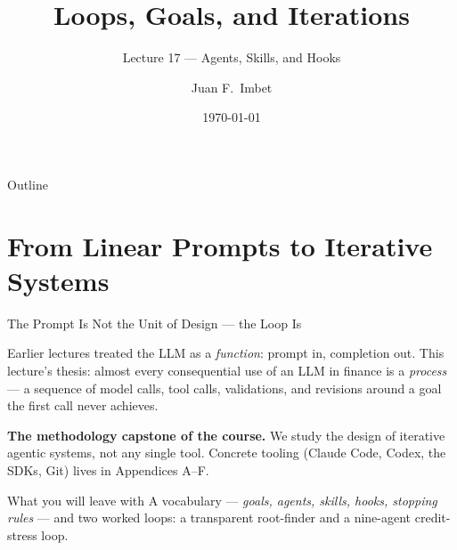 \documentclass[9pt,t]{beamer}
\title{Loops, Goals, and Iterations}
\subtitle{Lecture 17 --- Agents, Skills, and Hooks}
\author{Juan F.\ Imbet}
\institute{Paris Dauphine -- PSL University}
\date{\today}
\begin{document}
\begin{frame}\titlepage\end{frame}

\begin{frame}{Outline}\tableofcontents\end{frame}

\section{From Linear Prompts to Iterative Systems}

\begin{frame}{The Prompt Is Not the Unit of Design --- the Loop Is}

\begin{bigpicture}
Earlier lectures treated the LLM as a \emph{function}: prompt in, completion out.
This lecture's thesis: almost every consequential use of an LLM in finance is a
\emph{process} --- a sequence of model calls, tool calls, validations, and
revisions around a goal the first call never achieves.
\end{bigpicture}

\medskip
\textbf{The methodology capstone of the course.} We study the \alert{design of
iterative agentic systems}, not any single tool. Concrete tooling (Claude Code,
Codex, the SDKs, Git) lives in Appendices A--F.

\medskip
\begin{block}{What you will leave with}
A vocabulary --- \emph{goals, agents, skills, hooks, stopping rules} --- and two
worked loops: a transparent root-finder and a nine-agent credit-stress loop.
\end{block}
\end{frame}
\end{document}
